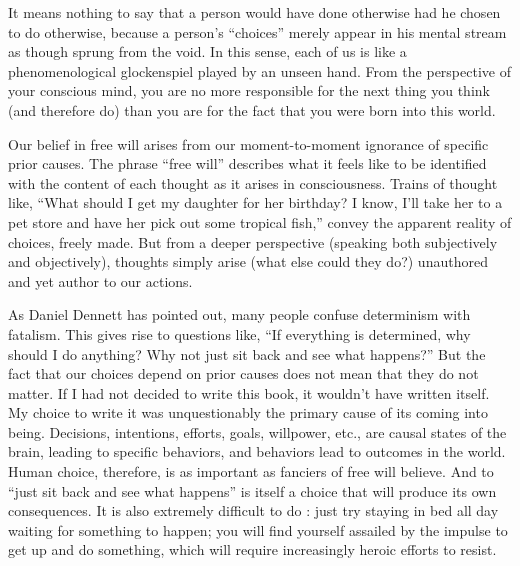 \documentclass[a4paper,14pt]{extbook}
\begin{document}
It means nothing to say that a person would have done otherwise had he chosen to do otherwise, because a person’s ``choices'' merely appear in his mental stream as though sprung from the void.
In this sense, each of us is like a phenomenological glockenspiel played by an unseen hand.
From the perspective of your conscious mind, you are no more responsible for the next thing you think (and therefore do) than you are for the fact that you were born into this world.

Our belief in free will arises from our moment-to-moment ignorance of specific prior causes.
The phrase ``free will'' describes what it feels like to be identified with the content of each thought as it arises in consciousness.
Trains of thought like, ``What should I get my daughter for her birthday? I know, I’ll take her to a pet store and have her pick out some tropical fish,'' convey the apparent reality of choices, freely made.
But from a deeper perspective (speaking both subjectively and objectively), thoughts simply arise (what else could they do?) unauthored and yet author to our actions.

As Daniel Dennett has pointed out, many people confuse determinism with fatalism.
This gives rise to questions like, ``If everything is determined, why should I do anything? Why not just sit back and see what happens?''
But the fact that our choices depend on prior causes does not mean that they do not matter.
If I had not decided to write this book, it wouldn’t have written itself.
My choice to write it was unquestionably the primary cause of its coming into being.
Decisions, intentions, efforts, goals, willpower, etc., are causal states of the brain, leading to specific behaviors, and behaviors lead to outcomes in the world.
Human choice, therefore, is as important as fanciers of free will believe.
And to ``just sit back and see what happens'' is itself a choice that will produce its own consequences.
It is also extremely difficult to do :
just try staying in bed all day waiting for something to happen;
you will find yourself assailed by the impulse to get up and do something, which will require increasingly heroic efforts to resist.
\end{document}
